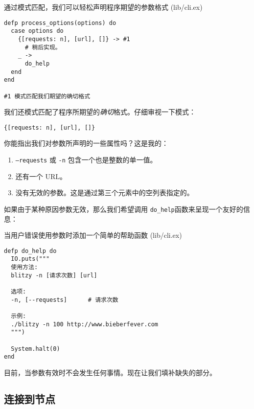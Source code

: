 \begin{code}{通过模式匹配，我们可以轻松声明程序期望的参数格式 (lib/cli.ex)}

\begin{verbatim}
defp process_options(options) do
  case options do
    {[requests: n], [url], []} -> #1
      # 稍后实现。
    _ ->
      do_help
  end
end

#1 模式匹配我们期望的确切格式
\end{verbatim}
\end{code}

我们还模式匹配了程序所期望的\emph{确切}格式。仔细审视一下模式：

\begin{code}{}
\begin{verbatim}
{[requests: n], [url], []}
\end{verbatim}
\end{code}

你能指出我们对参数所声明的一些属性吗？这是我的：

\begin{enumerate}
\def\labelenumi{\arabic{enumi}.}
\item  \texttt{--requests} 或 \texttt{-n}  包含一个也是整数的单一值。
\item  还有一个 URL。
\item  没有无效的参数。这是通过第三个元素中的空列表指定的。
\end{enumerate}

如果由于某种原因参数无效，那么我们希望调用 \texttt{do\_help}函数来呈现一个友好的信息：


\begin{code}{当用户错误使用参数时添加一个简单的帮助函数 (lib/cli.ex)}

\begin{verbatim}
defp do_help do
  IO.puts("""
  使用方法:
  blitzy -n [请求次数] [url]

  选项:
  -n, [--requests]      # 请求次数

  示例:
  ./blitzy -n 100 http://www.bieberfever.com
  """)

  System.halt(0)
end
\end{verbatim}
\end{code}

目前，当参数有效时不会发生任何事情。现在让我们填补缺失的部分。

\subsection{连接到节点}

